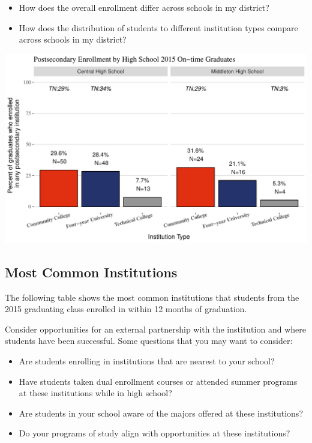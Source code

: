 \documentclass[11pt,]{article}
\providecommand{\tightlist}{%
  \setlength{\itemsep}{0pt}\setlength{\parskip}{0pt}}
\begin{document}
\begin{itemize}
\tightlist
\item
  How does the overall enrollment differ across schools in my district?
\item
  How does the distribution of students to different institution types
  compare across schools in my district?
\end{itemize}

\includegraphics{20170411_PSWRR_no_CTE_files/figure-latex/Enrollment by School-1.pdf}

\newpage

\subsection{Most Common Institutions}\label{most-common-institutions}

The following table shows the most common institutions that students
from the 2015 graduating class enrolled in within 12 months of
graduation.

Consider opportunities for an external partnership with the institution
and where students have been successful. Some questions that you may
want to consider:

\begin{itemize}
\tightlist
\item
  Are students enrolling in institutions that are nearest to your
  school?
\item
  Have students taken dual enrollment courses or attended summer
  programs at these institutions while in high school?
\item
  Are students in your school aware of the majors offered at these
  institutions?
\item
  Do your programs of study align with opportunities at these
  institutions?
\end{itemize}
\end{document}
